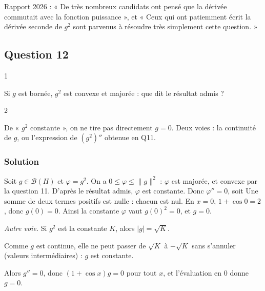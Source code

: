 \documentclass[11pt,a4paper]{article}
\newcommand{\equationajustee}[1]{%
  \sbox{\boiteequation}{$\displaystyle #1$}%
  \ifdim\wd\boiteequation>\linewidth
    \[\resizebox{\linewidth}{!}{\usebox{\boiteequation}}\]%
  \else
    \[#1\]%
  \fi}
\begin{document}
\begin{jury}

Rapport 2026 : « De très nombreux candidats ont pensé que la dérivée commutait avec la fonction puissance », et « Ceux qui ont patiemment écrit la dérivée seconde de \(g^2\) sont parvenus à résoudre très simplement cette question. »

\end{jury}

\hypertarget{question-12}{%
\subsection{Question 12}\label{question-12}}

\begin{indication}{1}

Si \(g\) est bornée, \(g^2\) est convexe et majorée : que dit le résultat admis ?

\end{indication}

\begin{indication}{2}

De « \(g^2\) constante », on ne tire pas directement \(g=0\). Deux voies : la continuité de \(g\), ou l'expression de \((g^2)''\) obtenue en Q11.

\end{indication}

\hypertarget{solution-11}{%
\subsubsection{Solution}\label{solution-11}}

Soit \(g\in\mathcal B(H)\) et \(\varphi=g^2\). On a \(0\le\varphi\le\|g\|^2\) : \(\varphi\) est majorée, et convexe par la question 11. D'après le résultat admis, \(\varphi\) est constante. Donc \(\varphi''=0\), soit
\equationajustee{\forall x\in\mathbb R,\quad 2g'(x)^2+2(1+\cos x)g(x)^2=0.}
Une somme de deux termes positifs est nulle : chacun est nul. En \(x=0\), \(1+\cos0=2\), donc \(g(0)=0\). Ainsi la constante \(\varphi\) vaut \(g(0)^2=0\), et \(g=0\).
\equationajustee{\boxed{\mathcal B(H)=\{0\}.}}

\emph{Autre voie.} Si \(g^2\) est la constante \(K\), alors \(|g|=\sqrt K\).

Comme \(g\) est continue, elle ne peut passer de \(\sqrt K\) à \(-\sqrt K\) sans s'annuler (valeurs intermédiaires) : \(g\) est constante.

Alors \(g''=0\), donc \((1+\cos x)g=0\) pour tout \(x\), et l'évaluation en \(0\) donne \(g=0\).
\end{document}
